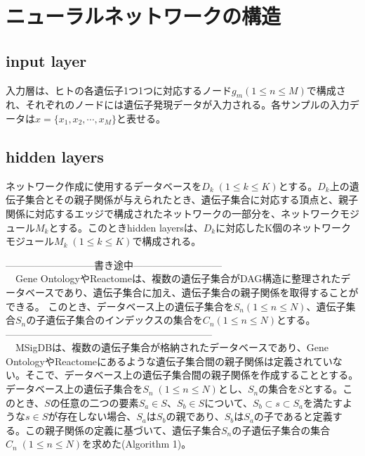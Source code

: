 \documentclass[a4paper,12pt]{jsreport}
\begin{document}
\section{ニューラルネットワークの構造}
\begin{comment}
\#\#\#\#\#\#\#\#\#\#\# \\
input layer、hidden layer、output layerについて全体と図\\
input layerについて\\
hidden layerについて(GO・ractomeとMSigDBのモジュール設計手法)\\
ノードの数の決め方、エッジの計算方法、tanhとbatchnorm\\
output layerについて\\
\#\#\#\#\#\#\#\#\#\#\# \\
\end{comment}


\subsection{input layer}
入力層は、ヒトの各遺伝子1つ1つに対応するノード$g_m(1\leq n\leq M)$で構成され、それぞれのノードには遺伝子発現データが入力される。各サンプルの入力データは$x = \{x_1, x_2, \cdots, x_M\}$と表せる。


\subsection{hidden layers}
ネットワーク作成に使用するデータベースを$D_k \; (1\leq k\leq K)$とする。$D_k$上の遺伝子集合とその親子関係が与えられたとき、遺伝子集合に対応する頂点と、親子関係に対応するエッジで構成されたネットワークの一部分を、ネットワークモジュール$M_k$とする。このときhidden layersは、$D_k$に対応したK個のネットワークモジュール$M_k \; (1\leq k\leq K)$で構成される。


\color{blue}---------------------------書き途中---------------------------\\
\color{black}
　Gene OntologyやReactomeは、複数の遺伝子集合がDAG構造に整理されたデータベースであり、遺伝子集合に加え、遺伝子集合の親子関係を取得することができる。
このとき、データベース上の遺伝子集合を$S_n(1\leq n\leq N)$、遺伝子集合$S_n$の子遺伝子集合のインデックスの集合を$C_n(1\leq n\leq N)$とする。\\
\color{blue}---------------------------------------------------------------\\
\color{black}
 　MSigDBは、複数の遺伝子集合が格納されたデータベースであり、Gene OntologyやReactomeにあるような遺伝子集合間の親子関係は定義されていない。そこで、データベース上の遺伝子集合間の親子関係を作成することとする。データベース上の遺伝子集合を$S_n \; (1\leq n\leq N)$とし、$S_n$の集合を$S$とする。このとき、$S$の任意の二つの要素$S_a \in S$、$S_b \in S$について、$S_{b} \subset s \subset S_a$を満たすような$s \in S$が存在しない場合、$S_a$は$S_b$の親であり、$S_b$は$S_a$の子であると定義する。この親子関係の定義に基づいて、遺伝子集合$S_n$の子遺伝子集合の集合$C_n \; (1\leq n\leq N)$を求めた(Algorithm 1)。\\
 
\end{document}
